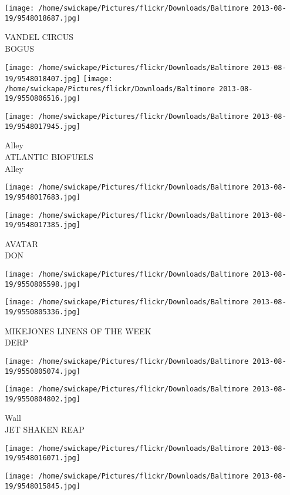 \documentclass[10pt,letterpaper]{article}
\begin{document}
\vspace{0.25in}
\texttt{[image: /home/swickape/Pictures/flickr/Downloads/Baltimore 2013-08-19/9548018687.jpg]}

VANDEL CIRCUS\\
BOGUS
\pagebreak

\texttt{[image: /home/swickape/Pictures/flickr/Downloads/Baltimore 2013-08-19/9548018407.jpg]}
\texttt{[image: /home/swickape/Pictures/flickr/Downloads/Baltimore 2013-08-19/9550806516.jpg]}

\texttt{[image: /home/swickape/Pictures/flickr/Downloads/Baltimore 2013-08-19/9548017945.jpg]}

Alley\\
ATLANTIC BIOFUELS\\
Alley
\pagebreak

\texttt{[image: /home/swickape/Pictures/flickr/Downloads/Baltimore 2013-08-19/9548017683.jpg]}

\vspace{0.25in}
\texttt{[image: /home/swickape/Pictures/flickr/Downloads/Baltimore 2013-08-19/9548017385.jpg]}

AVATAR\\
DON
\pagebreak

\texttt{[image: /home/swickape/Pictures/flickr/Downloads/Baltimore 2013-08-19/9550805598.jpg]}

\vspace{0.25in}
\texttt{[image: /home/swickape/Pictures/flickr/Downloads/Baltimore 2013-08-19/9550805336.jpg]}

MIKEJONES LINENS OF THE WEEK\\
DERP
\pagebreak

\texttt{[image: /home/swickape/Pictures/flickr/Downloads/Baltimore 2013-08-19/9550805074.jpg]}

\vspace{0.25in}
\texttt{[image: /home/swickape/Pictures/flickr/Downloads/Baltimore 2013-08-19/9550804802.jpg]}

Wall\\
JET SHAKEN REAP
\pagebreak

\texttt{[image: /home/swickape/Pictures/flickr/Downloads/Baltimore 2013-08-19/9548016071.jpg]}

\vspace{0.25in}
\texttt{[image: /home/swickape/Pictures/flickr/Downloads/Baltimore 2013-08-19/9548015845.jpg]}
\end{document}

